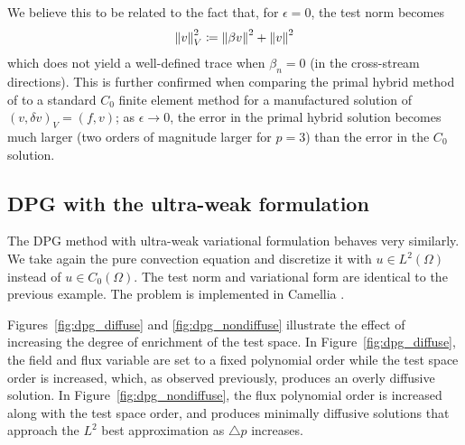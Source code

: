 \documentclass[final,leqno]{siamltex}
\newcommand{\nor}[1]{\left\| #1 \right\|}
\newcommand{\LRp}[1]{\left( #1 \right)}
\renewcommand{\L}{L^2\LRp{\Omega}}
\let\grad\relax
\newcommand{\grad}{\nabla}
\begin{document}
We believe this to be related to the fact that, for $\epsilon = 0$, the test norm becomes 
\[
\nor{v}^2_V \coloneqq \nor{\beta\grad v}^2 + \nor{v}^2
\]
which does not yield a well-defined trace when $\beta_n = 0$ (in the cross-stream directions).  This is further confirmed when comparing the primal hybrid method of \cite{raviart1977primal} to a standard $C_0$ finite element method for a manufactured solution of $\LRp{v,\delta v}_V = \LRp{f,v}$; as $\epsilon \rightarrow 0$, the error in the primal hybrid solution becomes much larger (two orders of magnitude larger for $p = 3$) than the error in the $C_0$ solution.  

\subsection{DPG with the ultra-weak formulation}

The DPG method with ultra-weak variational formulation \cite{DPG1,DPG2} behaves very similarly.  We take again the pure convection equation and discretize it with $u \in \L$ instead of $u \in C_0(\Omega)$.  The test norm and variational form are identical to the previous example.  The problem is implemented in Camellia \cite{Camellia}.  

Figures~\ref{fig:dpg_diffuse} and \ref{fig:dpg_nondiffuse} illustrate the effect of increasing the degree of enrichment of the test space.  In Figure~\ref{fig:dpg_diffuse}, the field and flux variable are set to a fixed polynomial order while the test space order is increased, which, as observed previously, produces an overly diffusive solution.  In Figure~\ref{fig:dpg_nondiffuse}, the flux polynomial order is increased along with the test space order, and produces minimally diffusive solutions that approach the $L^2$ best approximation as $\triangle p$ increases.  
\end{document}

